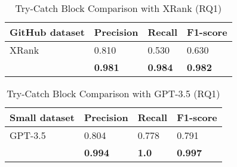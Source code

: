 \begin{table}[t]%
  \caption{Try-Catch Block Comparison with XRank (RQ1)}
  \vspace{-12pt}
  \small
	\begin{center}
		\renewcommand{\arraystretch}{1}
		\begin{tabular}{| p{3.05cm}<{\centering} | p{1.2cm}<{\centering} | p{1.2cm}<{\centering}| p{1.2cm}<{\centering}|}
		  \hline
			GitHub dataset  & Precision  &  Recall & F1-score \\
			\hline
			XRank & 0.810 & 0.530 & 0.630\\
			\hline
			\tool   &  \textbf{0.981} &  {\bf 0.984} & \textbf{0.982}\\
			\hline
		\end{tabular}
		\label{tab:xblock-1}
	\end{center}
\end{table}

\begin{table}[t]%
  \caption{Try-Catch Block Comparison with GPT-3.5 (RQ1)}
  \vspace{-12pt}
  \small
	\begin{center}
		\renewcommand{\arraystretch}{1}
		\begin{tabular}{| p{1.85cm}<{\centering} | p{1.6cm}<{\centering} | p{1.6cm}<{\centering}| p{1.6cm}<{\centering}|}
		  \hline
		Small dataset	  & Precision  &  Recall & F1-score \\
			\hline
                        GPT-3.5  & 0.804  & 0.778   & 0.791\\
			\hline
			\tool   &  \textbf{0.994} &  {\bf 1.0} & \textbf{0.997}\\
			\hline
		\end{tabular}
		\label{tab:xblock-2}
	\end{center}
\end{table}




